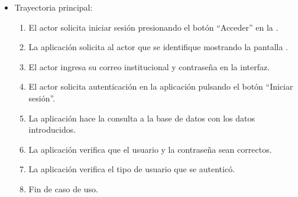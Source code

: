 			\begin{itemize}
	\item Trayectoria principal:
		\begin{enumerate}
			\item El actor solicita iniciar sesión presionando el botón “Acceder” en la .
			\item La aplicación solicita al actor que se identifique mostrando la pantalla .
			\item El actor ingresa su correo institucional y contraseña en la interfaz.
			\item El actor solicita autenticación en la aplicación pulsando el botón “Iniciar sesión”. 
			\item La aplicación hace la consulta a la base de datos con los datos introducidos.
			\item La aplicación verifica que el usuario y la contraseña sean correctos.
			\item La aplicación verifica el tipo de usuario que se autenticó.
			\item Fin de caso de uso.


\end{enumerate}
\end{itemize}

